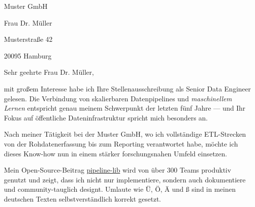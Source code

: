 
Muster GmbH

Frau Dr. Müller

Musterstraße 42

20095 Hamburg

Sehr geehrte Frau Dr. Müller,

mit großem Interesse habe ich Ihre Stellenausschreibung als Senior Data Engineer gelesen.
Die Verbindung von skalierbaren Datenpipelines und \textit{maschinellem Lernen} entspricht
genau meinem Schwerpunkt der letzten fünf Jahre --- und Ihr Fokus auf öffentliche Dateninfrastruktur
spricht mich besonders an.

Nach meiner Tätigkeit bei der Muster GmbH, wo ich vollständige ETL-Strecken von der
Rohdatenerfassung bis zum Reporting verantwortet habe, möchte ich dieses Know-how
nun in einem stärker forschungsnahen Umfeld einsetzen.

Mein Open-Source-Beitrag \href{https://github.com/beispiel/pipeline-lib}{pipeline-lib}
wird von über 300 Teams produktiv genutzt und zeigt, dass ich nicht nur implementiere,
sondern auch dokumentiere und community-tauglich designt. Umlaute wie Ü, Ö, Ä und ß
sind in meinen deutschen Texten selbstverständlich korrekt gesetzt.

